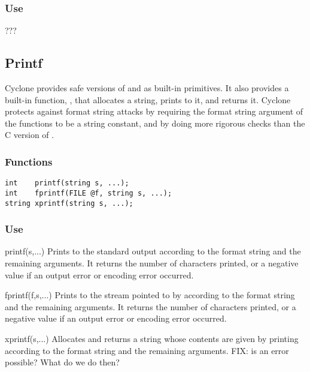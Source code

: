 \subsubsection*{Use}

???

\subsection{Printf}

Cyclone provides safe versions of  and  as
built-in primitives.  It also provides a built-in function,
, that allocates a string, prints to it, and returns it.
Cyclone protects against format string attacks by requiring the format
string argument of the  functions to be a string constant,
and by doing more rigorous checks than the C version of .

\subsubsection*{Functions}
\begin{verbatim}
int    printf(string s, ...);
int    fprintf(FILE @f, string s, ...);
string xprintf(string s, ...);
\end{verbatim}

\subsubsection*{Use}

\begin{defun}{printf}{(s,...)}
Prints to the standard output according to the format string  and
the remaining arguments.  It returns the number of characters printed,
or a negative value if an output error or encoding error occurred.
\end{defun}

\begin{defun}{fprintf}{(f,s,...)}
Prints to the stream pointed to by  according to the format
string  and the remaining arguments.  It returns the number of
characters printed, or a negative value if an output error or encoding
error occurred.
\end{defun}

\begin{defun}{xprintf}{(s,...)}
Allocates and returns a string whose contents are given by printing
according to the format string  and the remaining arguments.
FIX: is an error possible?  What do we do then?
\end{defun}


